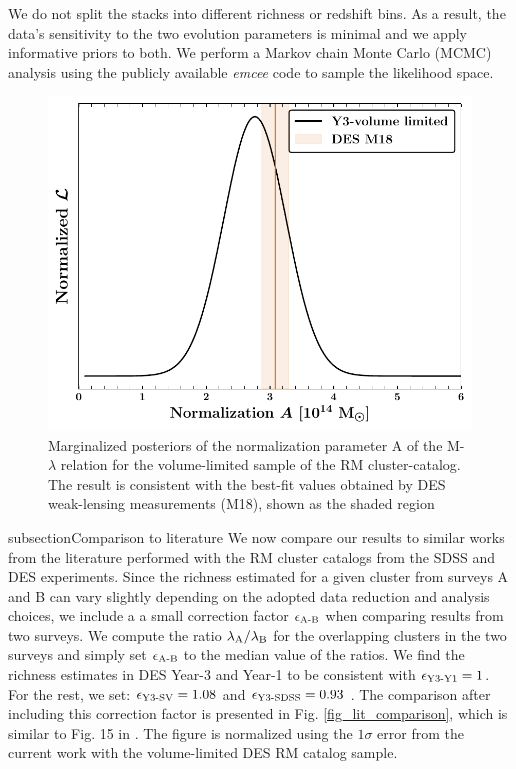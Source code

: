 We do not split the stacks into different richness or redshift bins.
As a result, the data's sensitivity to the two evolution parameters is minimal and we apply informative priors to both.
We perform a Markov chain Monte Carlo (MCMC) analysis %
using the publicly available \emph{emcee} \citep{mackey13} code to sample the likelihood space.
\begin{figure}
\includegraphics[width=\linewidth]{figs/M_rich_fitting_y3_v6_4_22_full_vl_JODY.pdf}
\caption{Marginalized posteriors of the normalization parameter A of the M-$\lambda$ relation for the volume-limited sample of the RM cluster-catalog. The result is consistent with the best-fit values obtained by DES weak-lensing measurements (M18), shown as the shaded region}
\end{figure}
subsection{Comparison to literature}\label{subsec_lit_comparison}
We now compare our results to similar works from the literature performed with the RM cluster catalogs from the SDSS and DES experiments. 
Since the richness estimated for a given cluster from surveys A and B can vary slightly depending on the adopted data reduction and analysis choices, we include a a small correction factor $\epsilon_{\rm A{\text -}B}$ when comparing results from two surveys.
We compute the ratio $\lambda_{\rm A}/\lambda_{\rm B}$ for the overlapping clusters in the two surveys and simply set $\epsilon_{\rm A{\text -}B}$ to the median value of the ratios.
We find the richness estimates in DES Year-3 and Year-1 to be consistent with $\epsilon_{\rm Y3{\text -}Y1} = 1$. 
For the rest, we set: $\epsilon_{\rm Y3{\text -}SV} = 1.08$ and $\epsilon_{\rm Y3{\text -}SDSS} = 0.93$ .
The comparison after including this correction factor is presented in Fig. \ref{fig_lit_comparison}, which is similar to Fig. 15 in . 
The figure is normalized using the $1\sigma$ error from the current work with the \whichyear{} volume-limited DES RM catalog sample.

